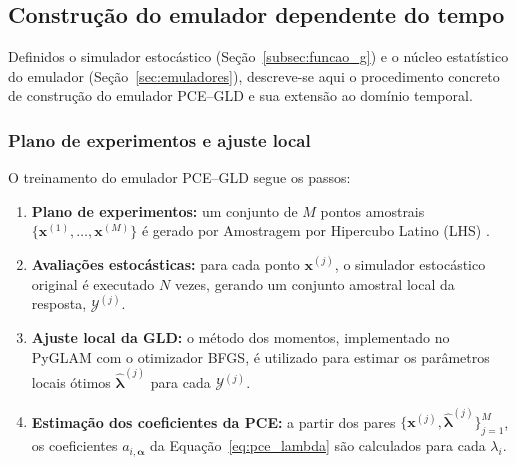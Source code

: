 
\subsection{Constru\c{c}\~ao do emulador dependente do tempo}
\label{subsec:construcao_emulador}

Definidos o simulador estocástico (Seção~\ref{subsec:funcao_g}) e o núcleo estatístico do emulador (Seção~\ref{sec:emuladores}), descreve-se aqui o procedimento concreto de construção do emulador PCE--GLD e sua extensão ao domínio temporal.

\subsubsection{Plano de experimentos e ajuste local}
\label{subsub:doe}

O treinamento do emulador PCE--GLD segue os passos:

\begin{enumerate}
    \item \textbf{Plano de experimentos:} um conjunto de $M$ pontos amostrais $\{\mathbf{x}^{(1)}, \dots, \mathbf{x}^{(M)}\}$ é gerado por Amostragem por Hipercubo Latino (LHS) \parencite{mckay1979}.
    \item \textbf{Avaliações estocásticas:} para cada ponto $\mathbf{x}^{(j)}$, o simulador estocástico original é executado $N$ vezes, gerando um conjunto amostral local da resposta, $\mathcal{Y}^{(j)}$.
    \item \textbf{Ajuste local da GLD:} o método dos momentos, implementado no PyGLAM com o otimizador BFGS, é utilizado para estimar os parâmetros locais ótimos $\hat{\boldsymbol{\lambda}}^{(j)}$ para cada $\mathcal{Y}^{(j)}$.
    \item \textbf{Estimação dos coeficientes da PCE:} a partir dos pares $\{\mathbf{x}^{(j)}, \hat{\boldsymbol{\lambda}}^{(j)}\}_{j=1}^M$, os coeficientes $a_{i, \boldsymbol{\alpha}}$ da Equação~\eqref{eq:pce_lambda} são calculados para cada $\lambda_i$.
\end{enumerate}

